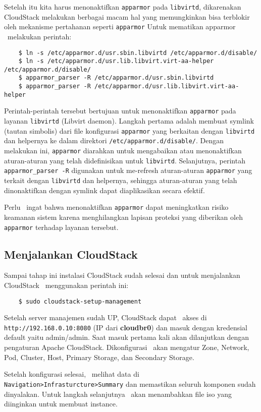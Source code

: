 Setelah itu kita harus menonaktifkan \texttt{apparmor} pada \texttt{libvirtd}, dikarenakan CloudStack melakukan berbagai macam hal yang memungkinkan bisa terblokir oleh mekanisme pertahanan seperti \texttt{apparmor} Untuk mematikan apparmor \saya\ melakukan perintah:

\begin{listing}[H]
    \begin{verbatim}   
    $ ln -s /etc/apparmor.d/usr.sbin.libvirtd /etc/apparmor.d/disable/
    $ ln -s /etc/apparmor.d/usr.lib.libvirt.virt-aa-helper /etc/apparmor.d/disable/
    $ apparmor_parser -R /etc/apparmor.d/usr.sbin.libvirtd
    $ apparmor_parser -R /etc/apparmor.d/usr.lib.libvirt.virt-aa-helper
    \end{verbatim}
\end{listing}

Perintah-perintah tersebut bertujuan untuk menonaktifkan \texttt{apparmor} pada layanan \texttt{libvirtd} (Libvirt daemon). Langkah pertama adalah membuat symlink (tautan simbolis) dari file konfigurasi \texttt{apparmor} yang berkaitan dengan \texttt{libvirtd} dan helpernya ke dalam direktori \texttt{/etc/apparmor.d/disable/}. Dengan melakukan ini, \texttt{apparmor} diarahkan untuk mengabaikan atau menonaktifkan aturan-aturan yang telah didefinisikan untuk \texttt{libvirtd}. Selanjutnya, perintah \texttt{apparmor\_parser -R} digunakan untuk me-refresh aturan-aturan \texttt{apparmor} yang terkait dengan \texttt{libvirtd} dan helpernya, sehingga aturan-aturan yang telah dinonaktifkan dengan symlink dapat diaplikasikan secara efektif.

Perlu \saya\ ingat bahwa menonaktifkan \texttt{apparmor} dapat meningkatkan risiko keamanan sistem karena menghilangkan lapisan proteksi yang diberikan oleh \texttt{apparmor} terhadap layanan tersebut.

\subsection{Menjalankan CloudStack}
Sampai tahap ini instalasi CloudStack sudah selesai dan untuk menjalankan CloudStack \saya\ menggunakan perintah ini:

\begin{listing}[H]
    \begin{verbatim}  
    $ sudo cloudstack-setup-management
    \end{verbatim}
\end{listing}

Setelah server manajemen sudah UP, CloudStack dapat \saya\ akses di \texttt{http://192.168.0.10:8080} (IP dari \textbf{cloudbr0}) dan masuk dengan kredensial default yaitu admin/admin. Saat masuk pertama kali akan dilanjutkan dengan pengaturan Apache CloudStack. Dikonfigurasi \saya\ akan mengatur Zone, Network, Pod, Cluster, Host, Primary Storage, dan Secondary Storage.

Setelah konfigurasi selesai, \saya\ melihat data di \texttt{Navigation>Infrasturcture>Summary} dan memastikan seluruh komponen sudah dinyalakan. Untuk langkah selanjutnya \saya\ akan menambahkan file iso yang diinginkan untuk membuat instance.
